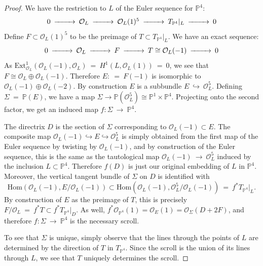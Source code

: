 \documentclass[twoside,12pt,reqno]{amsart}
\theoremstyle{plain}
\theoremstyle{definition}
\newcommand{\PP}{\mathbb{P}}
\def\ps{\vspace{4pt}}
\newcommand{\OO}{\mathcal O}
\begin{document}
\begin{proof}  We have the restriction to $L$ of the Euler sequence
for $\PP^4$:
\begin{equation}\begin{CD}
0 @>>> \OO_L @>>> \OO_L(1)^5 @>>> T_{\PP^4}|_L @>>> 0
\end{CD}\end{equation}
Define $F\subset \OO_L(1)^5$ to be the preimage of $T\subset
T_{\PP^4}|_L$.  We have an exact sequence:
\begin{equation}\begin{CD}
0 @>>> \OO_L @>>> F @>>> T\cong \OO_L(-1) @>>> 0
\end{CD}
\end{equation}
As $\text{Ext}^1_{\OO_L}(\OO_L(-1),\OO_L) ~=~ H^1(L,\OO_L(1)) ~=~ 0$, we
see that $F\cong \OO_L \oplus \OO_L(-1)$.  Therefore $E:~=~ F(-1)$ is
isomorphic to $\OO_L(-1)\oplus \OO_L(-2)$.  By construction $E$ is 
a subbundle $E~\hookrightarrow~ \OO_L^5$.  Defining $\Sigma~=~\PP(E)$, we have 
a map $\Sigma \rightarrow \PP(\OO_{L}^5)\cong \PP^1 \times \PP^4$.
Projecting onto the second factor, we get an induced map
$f:\Sigma~\rightarrow~ \PP^4$.

\ps

The directrix $D$ is the section of $\Sigma$ corresponding to
$\OO_L(-1)\subset E$.  The composite map $\OO_L(-1)\hookrightarrow 
E\hookrightarrow \OO_L^5$ is simply obtained from the first map of the 
Euler sequence by twisting by $\OO_L(-1)$,  and by construction of the 
Euler sequence, this is the same as the tautological map
$\OO_L(-1)~\rightarrow~ \OO_L^5$ induced by the inclusion $L\subset
\PP^4$.  Therefore $f(D)$ is just our original embedding of
$L$ in $\PP^4$.  Moreover, the vertical tangent bundle of $\Sigma$ on
$D$ is identified with
\begin{equation}
\text{Hom}(\OO_L(-1),E/\OO_L(-1))\subset
\text{Hom}(\OO_L(-1),\OO_L^5/\OO_L(-1))~=~ f^{*}T_{\PP^4}|_L .
\end{equation}
By construction of $E$ as the preimage of $T$, this is precisely 
$F/\OO_L ~=~ f^{*}T\subset f^{*}T_{\PP^4}|_D$.  
As well, $f^{*}\OO_{\PP^4}(1)=\OO_E(1)=\OO_{\Sigma}(D+2F)$, and 
therefore $f:\Sigma~\rightarrow~ \PP^4$ is the necessary scroll.

\ps

To see that $\Sigma$ is unique, simply observe that the lines through
the points of $L$ are determined by the direction of $T$ in
$T_{\PP^4}$.  Since the scroll is the union of its lines through $L$,
we see that $T$ uniquely determines the scroll.
\end{proof}
\end{document}
